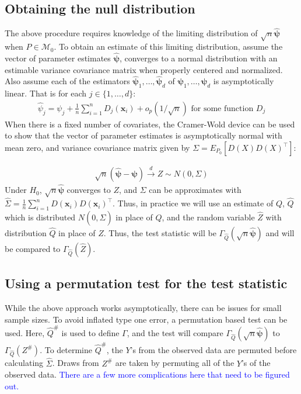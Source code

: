 \documentclass{article}
\newcommand{\rvo}{X}
\newcommand{\disto}{P}
\newcommand{\rvv}{Z}
\newcommand{\distv}{Q}
\begin{document}
\subsection{Obtaining the null distribution}
\label{ssec:obtaining_null}
The above procedure requires knowledge of the limiting distribution of $\sqrt{n}\hat{\boldsymbol{\psi}}$ when $P \in \mathscr{M}_0$.  To obtain an estimate of this limiting distribution, assume the vector of parameter estimates $\hat{\boldsymbol{\psi}}$, converges to a normal distribution with an estimable variance covariance matrix when properly centered and normalized. Also assume each of the estimators $\hat{\boldsymbol{\psi}}_1, \dots, \hat{\boldsymbol{\psi}}_d$ of $\boldsymbol{\psi}_1, \dots, \boldsymbol{\psi}_d$ is asymptotically linear.  That is for each $j \in \{1, \dots, d\}$:
\begin{align*}
\hat{\psi}_j = \psi_j + \frac{1}{n}\sum_{i=1}^n D_j(\boldsymbol{x}_i) + o_p(1/\sqrt{n}) \text{ for some function } D_j
\end{align*}
When there is a fixed number of covariates, the Cramer-Wold device can be used to show that the vector of parameter estimates is asymptotically normal with mean zero, and variance covariance matrix given by $\Sigma = E_{\disto_0}\left[D(\rvo) D(\rvo)^\top \right]$:

\begin{align*}
    \sqrt{n}\left(\hat{\boldsymbol{\psi}} - \boldsymbol{\psi}\right) \xrightarrow{d} Z \sim N\left(0, \Sigma\right)
\end{align*}
Under $H_0$, $\sqrt{n}\hat{\boldsymbol{\psi}}$ converges to $Z$, and $\Sigma$ can be approximates with $\widehat{\Sigma} = \frac{1}{n}\sum_{i = 1}^n D(\boldsymbol{x}_i) D(\boldsymbol{x}_i)^\top$.  Thus, in practice we will use an estimate of $\distv$, $\hat{\distv}$ which is distributed $N(0, \widehat{\Sigma})$ in place of $\distv$, and the random variable $\hat{\rvv}$ with distribution $\hat{\distv}$ in place of $\rvv$.  Thus, the test statistic will be $\Gamma_{\hat{\distv}}(\sqrt{n} \hat{\boldsymbol{\psi}})$ and will be compared to $\Gamma_{\hat{\distv}}(\hat{\rvv})$.

\subsection{Using a permutation test for the test statistic}
While the above approach works asymptotically, there can be issues for small sample sizes.  To avoid inflated type one error, a permutation based test can be used.  Here, $\hat{\distv}^\#$ is used to define $\Gamma$, and the test will compare $\Gamma_{\hat{\distv}}(\sqrt{n} \hat{\boldsymbol{\psi}})$ to $\Gamma_{\hat{\distv}}(\rvv^\#)$. To determine $\hat{\distv}^\#$, the $Y$'s from the observed data are permuted before calculating $\widehat \Sigma$.  Draws from $\rvv^\#$ are taken by permuting all of the $Y$'s of the observed data.  \textcolor{blue}{There are a few more complications here that need to be figured out.}
\end{document}
